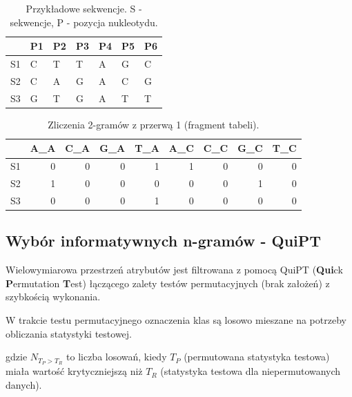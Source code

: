 \documentclass[10pt]{beamer}\usepackage[]{graphicx}\usepackage[]{color}
\begin{document}
\begin{frame}

\begin{table}[ht]
\centering
\begin{tabular}{rllllll}
  \hline
 & P1 & P2 & P3 & P4 & P5 & P6 \\ 
  \hline
S1 & C & T & T & A & G & C \\ 
  S2 & C & A & G & A & C & G \\ 
  S3 & G & T & G & A & T & T \\ 
   \hline
\end{tabular}
\caption{Przykładowe sekwencje.  S - sekwencje, P - pozycja nukleotydu.} 
\end{table}

  

  
\begin{table}[ht]
\centering
\begin{tabular}{rrrrrrrrr}
  \hline
 & A\_A & C\_A & G\_A & T\_A & A\_C & C\_C & G\_C & T\_C \\ 
  \hline
S1 & 0 & 0 & 0 & 1 & 1 & 0 & 0 & 0 \\ 
  S2 & 1 & 0 & 0 & 0 & 0 & 0 & 1 & 0 \\ 
  S3 & 0 & 0 & 0 & 1 & 0 & 0 & 0 & 0 \\ 
   \hline
\end{tabular}
\caption{Zliczenia 2-gramów z przerwą 1 (fragment tabeli).} 
\end{table}


\end{frame}

\subsection{Wybór informatywnych n-gramów - QuiPT}

\begin{frame}

Wielowymiarowa przestrzeń atrybutów jest filtrowana z pomocą QuiPT (\textbf{Qui}ck \textbf{P}ermutation \textbf{T}est) łączącego zalety testów permutacyjnych (brak założeń) z szybkością wykonania.

\end{frame}

\begin{frame}
W trakcie testu permutacyjnego oznaczenia klas są losowo mieszane na potrzeby obliczania statystyki testowej.
    
\begin{center}
\end{center}

gdzie $N_{T_P > T_R}$ to liczba losowań, kiedy $T_P$ (permutowana statystyka testowa) miała wartość krytyczniejszą niż $T_R$ (statystyka testowa dla niepermutowanych danych).
      
\end{frame}
\end{document}
